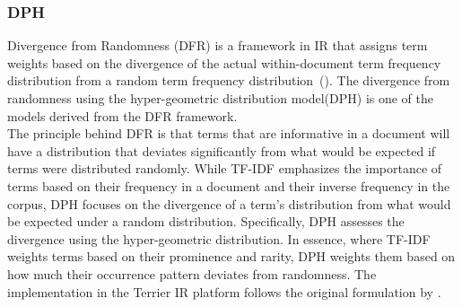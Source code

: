 \subsubsection{DPH}\label{sec:dph}
Divergence from Randomness (DFR) is a framework in IR that assigns term weights based on the divergence of the actual within-document term frequency distribution from a random term frequency distribution~(\cite{amati:2006:Frequentist}).
The divergence from randomness using the hyper-geometric distribution model(DPH) is one of the models derived from the DFR framework.
\\
The principle behind DFR is that terms that are informative in a document will have a distribution that deviates significantly from what would be expected if terms were distributed randomly.
While TF-IDF emphasizes the importance of terms based on their frequency in a document and their inverse frequency in the corpus, DPH focuses on the divergence of a term's distribution from what would be expected under a random distribution.
Specifically, DPH assesses the divergence using the hyper-geometric distribution.
In essence, where TF-IDF weights terms based on their prominence and rarity, DPH weights them based on how much their occurrence pattern deviates from randomness.
The implementation in the Terrier IR platform follows the original formulation by \cite{amati:2006:Frequentist}.


